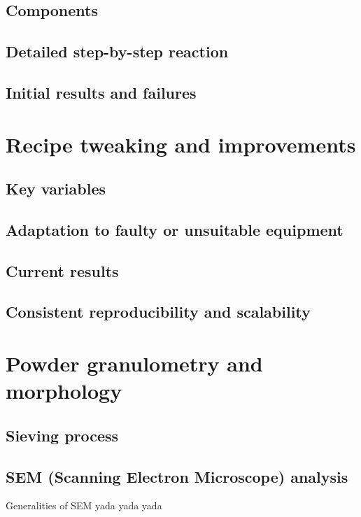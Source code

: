 \documentclass{article}
\begin{document}
        \subsection{Components\label{Components}}
        \subsection{Detailed step-by-step reaction\label{detailed_reaction}}
        \subsection{Initial results and failures\label{initial_failures}}

    \clearpage

    \section{Recipe tweaking and improvements\label{recipe_improvement}}
        \subsection{Key variables\label{key_variables}}
        \subsection{Adaptation to faulty or unsuitable equipment\label{faulty_equipment}}
        \subsection{Current results\label{promising_results}}
        \subsection{Consistent reproducibility and scalability\label{consistent_reproducibility}}

    \clearpage
    \section{Powder granulometry and morphology\label{powder_granulometry_morphology}}
        \subsection{Sieving process\label{sieving}}

    \clearpage
        \subsection{SEM (Scanning Electron Microscope) analysis\label{SEM_analysis}}
        Generalities of SEM yada yada yada 
\end{document}
